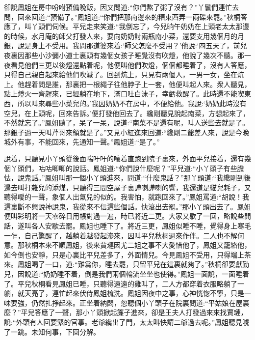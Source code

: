 \begin{parag}
    卻說鳳姐在房中吩咐預備晚飯，因又問道:“你們熬了粥了沒有？”丫鬟們連忙去問，回來回道:“預備了。”鳳姐道:“你們把那南邊來的糟東西弄一兩碟來罷。”秋桐答應了，叫丫頭們伺候。平兒走來笑道:“我倒忘了，今兒晌午奶奶在上頭老太太那邊的時候，水月庵的師父打發人來，要向奶奶討兩瓶南小菜，還要支用幾個月的月銀，說是身上不受用。我問那道婆來着:‘師父怎麼不受用？’他說:‘四五天了，前兒夜裏因那些小沙彌小道士裏頭有幾個女孩子睡覺沒有吹燈，他說了幾次不聽。那一夜看見他們三更以後燈還點着呢，他便叫他們吹燈，個個都睡着了，沒有人答應，只得自己親自起來給他們吹滅了。回到炕上，只見有兩個人，一男一女，坐在炕上。他趕着問是誰，那裏把一根繩子往他脖子上一套，他便叫起人來。衆人聽見，點上燈火一齊趕來，已經躺在地下，滿口吐白沫子，幸虧救醒了。此時還不能喫東西，所以叫來尋些小菜兒的。’我因奶奶不在房中，不便給他。我說:‘奶奶此時沒有空兒，在上頭呢，回來告訴。’便打發他回去了。纔剛聽見說起南菜，方想起來了，不然就忘了。”鳳姐聽了，呆了一呆，說道:“南菜不是還有呢，叫人送些去就是了。那銀子過一天叫芹哥來領就是了。”又見小紅進來回道:“纔剛二爺差人來，說是今晚城外有事，不能回來，先通知一聲。”鳳姐道:“是了。”
\end{parag}


\begin{parag}
    說着，只聽見小丫頭從後面喘吁吁的嚷着直跑到院子裏來，外面平兒接着，還有幾個丫頭們，咕咕唧唧的說話。鳳姐道:“你們說什麼呢？”平兒道:“小丫頭子有些膽怯，說鬼話。”鳳姐叫那一個小丫頭進來，問道:“什麼鬼話？”那丫頭道:“我纔剛到後邊去叫打雜兒的添煤，只聽得三間空屋子裏譁喇譁喇的響，我還道是貓兒耗子，又聽得噯的一聲，象個人出氣兒的似的。我害怕，就跑回來了。”鳳姐罵道:“胡說！我這裏斷不興說神說鬼，我從來不信這些個話。快滾出去罷。”那小丫頭出去了。鳳姐便叫彩明將一天零碎日用帳對過一遍，時已將近二更。大家又歇了一回，略說些閒話，遂叫各人安歇去罷。鳳姐也睡下了。將近三更，鳳姐似睡不睡，覺得身上寒毛一乍，自己驚醒了，越躺着越發起滲來，因叫平兒秋桐過來作伴。二人也不解何意。那秋桐本來不順鳳姐，後來賈璉因尤二姐之事不大愛惜他了，鳳姐又籠絡他，如今倒也安靜，只是心裏比平兒差多了，外面情兒。今見鳳姐不受用，只得端上茶來。鳳姐喝了一口，道:“難爲你，睡去罷，只留平兒在這裏就夠了。”秋桐卻要獻勤兒，因說道:“奶奶睡不着，倒是我們兩個輪流坐坐也使得。”鳳姐一面說，一面睡着了。平兒秋桐看見鳳姐已睡，只聽得遠遠的雞叫了，二人方都穿着衣服略躺了一躺，就天亮了，連忙起來伏侍鳳姐梳洗。鳳姐因夜中之事，心神恍惚不寧，只是一味要強，仍然扎掙起來。正坐着納悶，忽聽個小丫頭子在院裏問道:“平姑娘在屋裏麼？”平兒答應了一聲，那小丫頭掀起簾子進來，卻是王夫人打發過來來找賈璉，說:“外頭有人回要緊的官事。老爺纔出了門，太太叫快請二爺過去呢。”鳳姐聽見唬了一跳。未知何事，下回分解。
\end{parag}